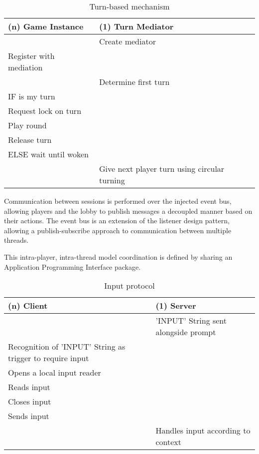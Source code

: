 \begin{table}[H]
	\centering
	\begin{tabular}{ | l | l | }
		\hline
		(n) Game Instance & (1) Turn Mediator \\
		\hline
		\hline
		 &  Create mediator \\
		\hline
		Register with mediation &  \\
		\hline
		& Determine first turn \\
		\hline 
		IF is my turn & \\
		\hline
		Request lock on turn & \\
		\hline
		Play round & \\
		\hline
		Release turn &  \\
		\hline
		ELSE wait until woken & \\ 
		\hline
		& Give next player turn using circular turning  \\
		\hline
	\end{tabular}
	\caption{Turn-based mechanism}
	\label{tab:turnBasedMechanism}
\end{table}

Communication between sessions is performed over the injected event bus, allowing players and the lobby to publish messages a decoupled manner based on their actions. The event bus is an extension of the listener design pattern, allowing a publish-subscribe approach to communication between multiple threads. 

This intra-player, intra-thread model coordination is defined by sharing an Application Programming Interface package. 

\begin{table}[H]
	\centering
	\begin{tabular}{ | l | l | }
		\hline
		(n) Client & (1) Server  \\
		\hline
		\hline
		&  'INPUT' String sent alongside prompt  \\
		\hline
		Recognition of 'INPUT' String as trigger to require input & \\
		\hline
		Opens a local input reader &  \\
		\hline
		Reads input &  \\
		\hline
		Closes input & \\
		\hline
		Sends input & \\
		\hline
		 &  Handles input  according to context \\
		\hline
	\end{tabular}
	\caption{Input protocol}
	\label{tab:inputProtocol}
\end{table}

